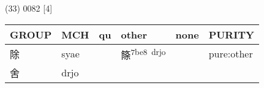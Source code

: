 \documentclass[14pt,a4paper]{scrartcl}
\begin{document}
(33) 0082 {[}4{]}

\begin{longtable}[c]{@{}llllll@{}}
\toprule
\begin{minipage}[b]{0.14\columnwidth}\raggedright\strut
GROUP
\strut\end{minipage} &
\begin{minipage}[b]{0.14\columnwidth}\raggedright\strut
MCH
\strut\end{minipage} &
\begin{minipage}[b]{0.14\columnwidth}\raggedright\strut
qu
\strut\end{minipage} &
\begin{minipage}[b]{0.14\columnwidth}\raggedright\strut
other
\strut\end{minipage} &
\begin{minipage}[b]{0.14\columnwidth}\raggedright\strut
none
\strut\end{minipage} &
\begin{minipage}[b]{0.14\columnwidth}\raggedright\strut
PURITY
\strut\end{minipage}\tabularnewline
\midrule
\endhead
\begin{minipage}[t]{0.14\columnwidth}\raggedright\strut
除
\strut\end{minipage} &
\begin{minipage}[t]{0.14\columnwidth}\raggedright\strut
syae
\strut\end{minipage} &
\begin{minipage}[t]{0.14\columnwidth}\raggedright\strut
\strut\end{minipage} &
\begin{minipage}[t]{0.14\columnwidth}\raggedright\strut
篨\textsuperscript{7be8~drjo}
\strut\end{minipage} &
\begin{minipage}[t]{0.14\columnwidth}\raggedright\strut
\strut\end{minipage} &
\begin{minipage}[t]{0.14\columnwidth}\raggedright\strut
pure:other
\strut\end{minipage}\tabularnewline
\begin{minipage}[t]{0.14\columnwidth}\raggedright\strut
舍
\strut\end{minipage} &
\begin{minipage}[t]{0.14\columnwidth}\raggedright\strut
drjo
\strut\end{minipage} &
\begin{minipage}[t]{0.14\columnwidth}\raggedright\strut
\strut\end{minipage} &

\end{longtable}
\end{document}
